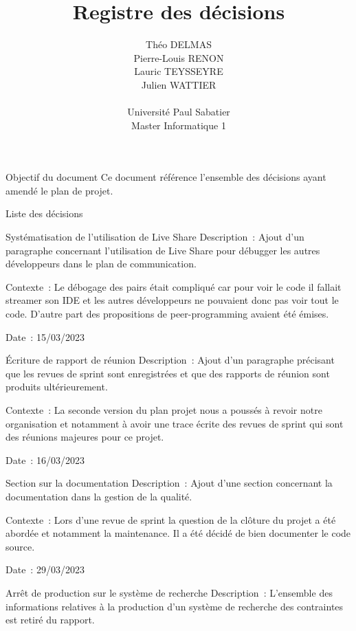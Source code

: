 \documentclass[]{article}
\title{Registre des décisions}
\author{
    Théo DELMAS\\
    Pierre-Louis RENON\\
    Lauric TEYSSEYRE\\
    Julien WATTIER\\
    \\
    Université Paul Sabatier\\
    Master Informatique 1\\
   }
\begin{document}
\maketitle
\newpage
\tableofcontents
\newpage

\begin{section}{Objectif du document}
 Ce document référence l'ensemble des décisions ayant amendé le plan de projet.
\end{section}

{
\setlength{\parindent}{0pt} %
\begin{section}{Liste des décisions}
 \begin{subsection}{Systématisation de l’utilisation de Live Share}
     Description : Ajout d’un paragraphe concernant l’utilisation de Live Share pour débugger les autres développeurs dans le plan de communication.

     Contexte : Le débogage des pairs était compliqué car pour voir le code il fallait streamer son IDE et les autres développeurs ne pouvaient donc pas voir tout le code. D’autre part des propositions de peer-programming avaient été émises.

     Date : 15/03/2023
 \end{subsection}
 \begin{subsection}{Écriture de rapport de réunion}
     Description : Ajout d’un paragraphe précisant que les revues de sprint sont enregistrées et que des rapports de réunion sont produits ultérieurement.

     Contexte : La seconde version du plan projet nous a poussés à revoir notre organisation et notamment à avoir une trace écrite des revues de sprint qui sont des réunions majeures pour ce projet.

     Date : 16/03/2023
 \end{subsection}
 \begin{subsection}{Section sur la documentation}
     Description : Ajout d’une section concernant la documentation dans la gestion de la qualité.

     Contexte : Lors d’une revue de sprint la question de la clôture du projet a été abordée et notamment la maintenance. Il a été décidé de bien documenter le code source.

     Date : 29/03/2023
 \end{subsection}
 \begin{subsection}{Arrêt de production sur le système de recherche}
     Description : L’ensemble des informations relatives à la production d’un système de recherche des contraintes est retiré du rapport.


\end{subsection}
\end{section}}
\end{document}
